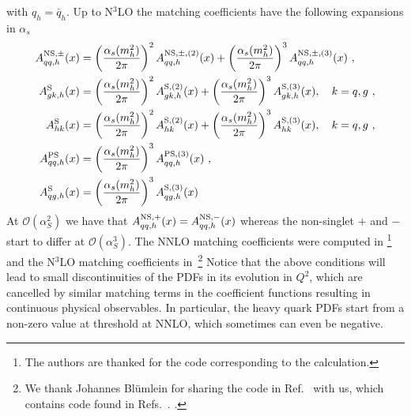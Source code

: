 with $q_h=\bar{q}_h$. Up to N$^3$LO the matching coefficients have the
following expansions in $\alpha_s$
\begin{align}
  A^{\rm NS,\pm}_{qq,h}(x) & = \left( \frac{\alpha_s(m_h^2)}{2\pi} \right)^2
  A^{\rm NS,\pm,(2)}_{qq,h}(x) + \left( \frac{\alpha_s(m_h^2)}{2\pi} \right)^3
  A^{\rm NS,\pm,(3)}_{qq,h}(x) \ , \nonumber \\
  A^{\rm S}_{gk,h}(x) & = \left( \frac{\alpha_s(m_h^2)}{2\pi} \right)^2
  A^{\rm S,(2)}_{gk,h}(x) + \left( \frac{\alpha_s(m_h^2)}{2\pi} \right)^3
  A^{\rm S,(3)}_{gk,h}(x), \quad k=q,g \ , \nonumber \\
  A^{\rm S}_{hk}(x) & = \left( \frac{\alpha_s(m_h^2)}{2\pi} \right)^2
  A^{\rm S,(2)}_{hk}(x) + \left( \frac{\alpha_s(m_h^2)}{2\pi} \right)^3
  A^{\rm S,(3)}_{hk}(x), \quad k=q,g \ , \nonumber \\
  A^{\rm PS}_{qq,h}(x) & = \left( \frac{\alpha_s(m_h^2)}{2\pi} \right)^3
  A^{\rm PS,(3)}_{qq,h}(x) \ , \nonumber \\
  A^{\rm S}_{qg,h}(x) & = \left( \frac{\alpha_s(m_h^2)}{2\pi} \right)^3
  A^{\rm S,(3)}_{qg,h}(x)
\end{align}
At $\mathcal{O}(\alpha_S^2)$ we have that $A^{\rm NS,+}_{qq,h}(x) =
A^{\rm NS,-}_{qq,h}(x)$ whereas the non-singlet $+$ and $-$ start to
differ at $\mathcal{O}(\alpha_S^3)$. The NNLO matching coefficients
were computed in \cite{NNLO-MTM}\footnote{The authors are thanked for
the code corresponding to the calculation.} and the N$^3$LO matching
coefficients
in~\cite{Bierenbaum:2009mv,Ablinger:2010ty,Kawamura:2012cr,Blumlein:2012vq,ABLINGER2014263,Ablinger:2014nga,Ablinger:2014vwa,Behring:2014eya,Ablinger:2019etw,Behring:2021asx,Ablinger:2023ahe,Ablinger:2024xtt}\footnote{We
thank Johannes Bl\"umlein for sharing the code in
Ref.~\cite{BlumleinCode} with us, which  contains code found
in 
Refs.~\cite{Ablinger:2024xtt,Fael:2022miw}.
%
.
}
%
Notice that the above
conditions will lead to small discontinuities of the PDFs in its
evolution in $Q^2$, which are cancelled by similar matching terms in
the coefficient functions resulting in continuous physical
observables. In particular, the heavy quark PDFs start from a non-zero
value at threshold at NNLO, which sometimes can even be negative.

